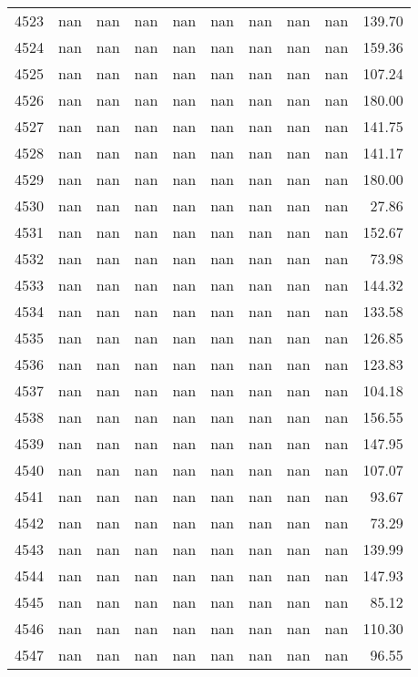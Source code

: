 \begin{tabular}{lrrrrrrrrr}
4523 & nan & nan & nan & nan & nan & nan & nan & nan & 139.70 \\
4524 & nan & nan & nan & nan & nan & nan & nan & nan & 159.36 \\
4525 & nan & nan & nan & nan & nan & nan & nan & nan & 107.24 \\
4526 & nan & nan & nan & nan & nan & nan & nan & nan & 180.00 \\
4527 & nan & nan & nan & nan & nan & nan & nan & nan & 141.75 \\
4528 & nan & nan & nan & nan & nan & nan & nan & nan & 141.17 \\
4529 & nan & nan & nan & nan & nan & nan & nan & nan & 180.00 \\
4530 & nan & nan & nan & nan & nan & nan & nan & nan & 27.86 \\
4531 & nan & nan & nan & nan & nan & nan & nan & nan & 152.67 \\
4532 & nan & nan & nan & nan & nan & nan & nan & nan & 73.98 \\
4533 & nan & nan & nan & nan & nan & nan & nan & nan & 144.32 \\
4534 & nan & nan & nan & nan & nan & nan & nan & nan & 133.58 \\
4535 & nan & nan & nan & nan & nan & nan & nan & nan & 126.85 \\
4536 & nan & nan & nan & nan & nan & nan & nan & nan & 123.83 \\
4537 & nan & nan & nan & nan & nan & nan & nan & nan & 104.18 \\
4538 & nan & nan & nan & nan & nan & nan & nan & nan & 156.55 \\
4539 & nan & nan & nan & nan & nan & nan & nan & nan & 147.95 \\
4540 & nan & nan & nan & nan & nan & nan & nan & nan & 107.07 \\
4541 & nan & nan & nan & nan & nan & nan & nan & nan & 93.67 \\
4542 & nan & nan & nan & nan & nan & nan & nan & nan & 73.29 \\
4543 & nan & nan & nan & nan & nan & nan & nan & nan & 139.99 \\
4544 & nan & nan & nan & nan & nan & nan & nan & nan & 147.93 \\
4545 & nan & nan & nan & nan & nan & nan & nan & nan & 85.12 \\
4546 & nan & nan & nan & nan & nan & nan & nan & nan & 110.30 \\
4547 & nan & nan & nan & nan & nan & nan & nan & nan & 96.55 \\

\end{tabular}
